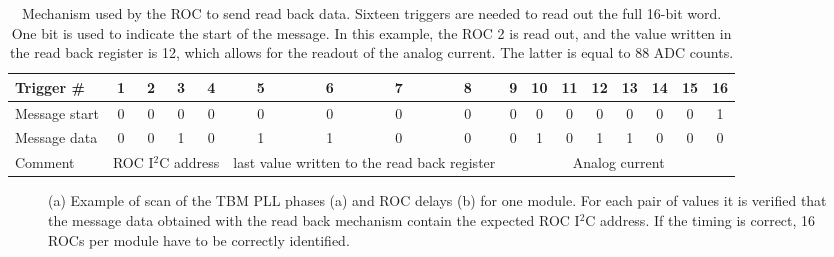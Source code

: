 \begin{table}[!htb]
  \caption{Mechanism used by the ROC to send read back data. Sixteen triggers are needed to read out the full 16-bit word. One bit is used to indicate the start of the message.
  In this example, the ROC 2 is read out, and the value written in the read back register is 12, which allows for the readout of the analog current. The latter is equal to 88 ADC counts.}
  \centering
  \begin{tabular}{|l|*{16}{c|}}
    \hline
    Trigger \#        & 1 & 2 & 3 & 4 & 5 & 6 & 7 & 8 & 9 & 10 & 11 & 12 & 13 & 14 & 15 & 16\\
    \hline
    Message start & 0 & 0 & 0 & 0 & 0 & 0 & 0 & 0 & 0 & 0   & 0  & 0   & 0   & 0   & 0   & 1\\
    \hline
    Message data & 0 & 0 & 1 & 0 & 1 & 1 & 0 & 0 & 0 & 1   & 0  & 1   & 1   & 0   & 0   & 0\\
    \hline
    Comment        & \multicolumn{4}{p{2cm}|}{\footnotesize ROC I$^2$C address} & \multicolumn{4}{p{2cm}|}{\footnotesize last value written to the read back register} & \multicolumn{8}{p{4cm}|}{\footnotesize Analog current}\\

    \hline    
  \end{tabular}
  \label{tab:ReadBack}
\end{table}

\begin{figure}[!htb]
 \begin{center}
 \end{center}
 \caption{(a) Example of scan of the TBM PLL phases (a) and ROC delays (b) for one module. For each pair of values it is verified that the message data obtained with the read back mechanism contain the expected ROC I$^2$C address. If the timing is correct, 16 ROCs per module have to be correctly identified.}
 \label{fig:TBMROCdelaysRB}
\end{figure} 

